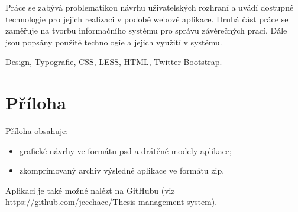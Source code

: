 \documentclass[11pt,oneside]{fithesis2}
\begin{document}
\FrontMatter
\ThesisTitlePage

\begin{ThesisDeclaration}
    \DeclarationText
    \AdvisorName
\end{ThesisDeclaration}

\begin{ThesisAbstract}
    Práce se zabývá problematikou návrhu uživatelských rozhraní a uvádí dostupné technologie pro jejich realizaci v podobě webové aplikace. Druhá část práce se zaměřuje na tvorbu informačního systému pro správu závěrečných prací. Dále jsou popsány použité technologie a jejich využití v systému.
\end{ThesisAbstract}

\begin{ThesisKeyWords}
    Design, Typografie, CSS, LESS, HTML, Twitter Bootstrap.
\end{ThesisKeyWords}

\MainMatter

\tableofcontents











\appendix

\chapter{Příloha}

Příloha obsahuje:

\begin{itemize}
    \item grafické návrhy ve formátu psd a drátěné modely aplikace;
    \item zkomprimovaný archív výsledné aplikace ve formátu zip.
\end{itemize}

Aplikaci je také možné nalézt na GitHubu (viz \url{https://github.com/jcechace/Thesis-management-system}).
\end{document}
